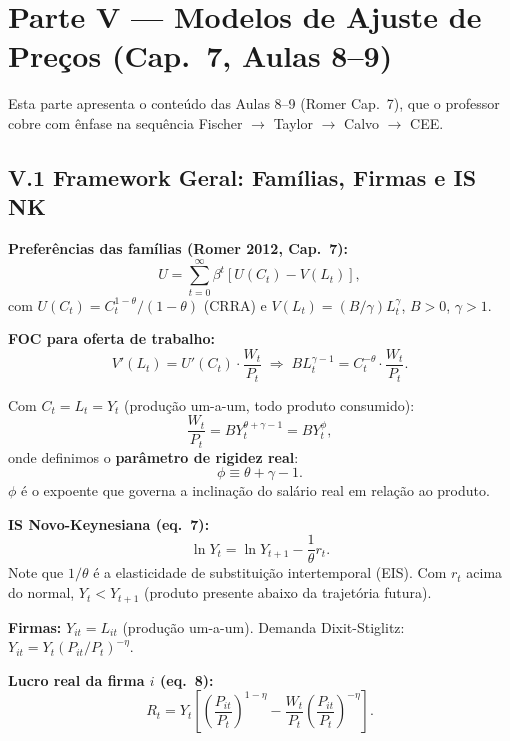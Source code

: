 \documentclass[12pt, a4paper]{article}
\begin{document}
\section*{\large\color{cyanrbc} Parte V --- Modelos de Ajuste de Preços (Cap.\ 7, Aulas 8--9)}

Esta parte apresenta o conteúdo das Aulas 8--9 (Romer Cap.\ 7), que o professor cobre com ênfase na sequência Fischer $\to$ Taylor $\to$ Calvo $\to$ CEE.

\subsection*{V.1 Framework Geral: Famílias, Firmas e IS NK}

\textbf{Preferências das famílias (Romer 2012, Cap.\ 7):}
\[
U = \sum_{t=0}^\infty \beta^t \left[U(C_t) - V(L_t)\right],
\]
com $U(C_t) = C_t^{1-\theta}/(1-\theta)$ (CRRA) e $V(L_t) = (B/\gamma)L_t^\gamma$, $B>0$, $\gamma>1$.

\textbf{FOC para oferta de trabalho:}
\[
V'(L_t) = U'(C_t)\cdot\frac{W_t}{P_t} \;\Longrightarrow\; BL_t^{\gamma-1} = C_t^{-\theta}\cdot\frac{W_t}{P_t}.
\]

Com $C_t = L_t = Y_t$ (produção um-a-um, todo produto consumido):
\begin{equation}
\frac{W_t}{P_t} = BY_t^{\theta+\gamma-1} = BY_t^{\phi}, \tag{eq.\ 6}
\end{equation}
onde definimos o \textbf{parâmetro de rigidez real}:
\[
\boxed{\phi \equiv \theta + \gamma - 1.}
\]
$\phi$ é o expoente que governa a inclinação do salário real em relação ao produto.

\textbf{IS Novo-Keynesiana (eq.\ 7):}
\begin{equation}
\ln Y_t = \ln Y_{t+1} - \frac{1}{\theta}r_t. \tag{eq.\ 7}
\end{equation}
Note que $1/\theta$ é a elasticidade de substituição intertemporal (EIS). Com $r_t$ acima do normal, $Y_t < Y_{t+1}$ (produto presente abaixo da trajetória futura).

\textbf{Firmas:} $Y_{it} = L_{it}$ (produção um-a-um). Demanda Dixit-Stiglitz: $Y_{it} = Y_t(P_{it}/P_t)^{-\eta}$.

\textbf{Lucro real da firma $i$ (eq.\ 8):}
\begin{equation}
R_t = Y_t\!\left[\left(\frac{P_{it}}{P_t}\right)^{1-\eta} - \frac{W_t}{P_t}\left(\frac{P_{it}}{P_t}\right)^{-\eta}\right]. \tag{eq.\ 8}
\end{equation}
\end{document}
